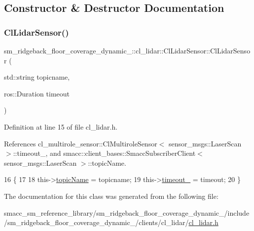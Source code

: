 \subsection{Constructor \& Destructor Documentation}
\mbox{\label{classsm__ridgeback__floor__coverage__dynamic__1_1_1cl__lidar_1_1ClLidarSensor_adf266200f5a79795e1f0daf202bed47e}} 
\subsubsection{\texorpdfstring{Cl\+Lidar\+Sensor()}{ClLidarSensor()}}
{\footnotesize\ttfamily sm\+\_\+ridgeback\+\_\+floor\+\_\+coverage\+\_\+dynamic\+\_\+::cl\+\_\+lidar\+::\+Cl\+Lidar\+Sensor\+::\+Cl\+Lidar\+Sensor (\begin{DoxyParamCaption}\item[{std\+::string}]{topicname,  }\item[{ros\+::\+Duration}]{timeout }\end{DoxyParamCaption})\hspace{0.3cm}{\ttfamily [inline]}}



Definition at line 15 of file cl\+\_\+lidar.\+h.



References cl\+\_\+multirole\+\_\+sensor\+::\+Cl\+Multirole\+Sensor$<$ sensor\+\_\+msgs\+::\+Laser\+Scan $>$\+::timeout\+\_\+, and smacc\+::client\+\_\+bases\+::\+Smacc\+Subscriber\+Client$<$ sensor\+\_\+msgs\+::\+Laser\+Scan $>$\+::topic\+Name.


\begin{DoxyCode}
16     \{
17 
18         this->\hyperlink{classsmacc_1_1client__bases_1_1SmaccSubscriberClient_aeadf21a09412c6c9488e5acd50fb4f40}{topicName} = topicname;
19         this->\hyperlink{classcl__multirole__sensor_1_1ClMultiroleSensor_a25cddc88db7d6208258630c0e5982f1e}{timeout\_} = timeout;
20     \}
\end{DoxyCode}


The documentation for this class was generated from the following file\+:\begin{DoxyCompactItemize}
\item 
smacc\+\_\+sm\+\_\+reference\+\_\+library/sm\+\_\+ridgeback\+\_\+floor\+\_\+coverage\+\_\+dynamic\+\_/include/sm\+\_\+ridgeback\+\_\+floor\+\_\+coverage\+\_\+dynamic\+\_/clients/cl\+\_\+lidar/\hyperlink{sm__ridgeback__floor__coverage__dynamic__1_2include_2sm__ridgeback__floor__coverage__dynamic__1_5a4256e1c341196a2485cfed07d21071}{cl\+\_\+lidar.\+h}\end{DoxyCompactItemize}
